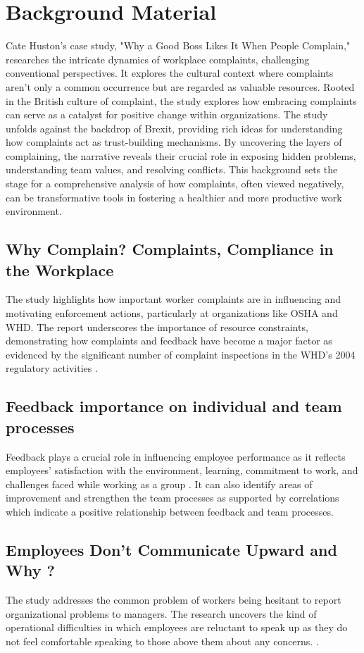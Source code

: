 \documentclass[a4paper,12pt]{report}
\begin{document}
\section{Background Material}
Cate Huston's case study, "Why a Good Boss Likes It When People Complain," researches the intricate dynamics of workplace complaints, challenging conventional perspectives. It explores the cultural context where complaints aren't only a common occurrence but are regarded as valuable resources.  Rooted in the British culture of complaint, the study explores how embracing complaints can serve as a catalyst for positive change within organizations. The study unfolds against the backdrop of Brexit, providing rich ideas for understanding how complaints act as trust-building mechanisms. By uncovering the layers of complaining,  the narrative reveals their crucial role in exposing hidden problems, understanding team values, and resolving conflicts. This background sets the stage for a comprehensive analysis of how complaints, often viewed negatively, can be transformative tools in fostering a healthier and more productive work environment.

\subsection{ Why Complain? Complaints, Compliance in the Workplace}
The study highlights how important worker complaints are in influencing and motivating enforcement actions, particularly at organizations like OSHA and WHD. The report underscores the importance of resource constraints, demonstrating how complaints and feedback have become a major factor as evidenced by the significant number of complaint inspections in the WHD's 2004 regulatory activities \cite{why_complaints}. 
\subsection{Feedback importance on individual and team processes}
Feedback plays a crucial role in influencing employee performance as it reflects employees' satisfaction with the environment, learning, commitment to work, and challenges faced while working as a group \cite{feedback_importance}. It can also identify areas of improvement and strengthen the team processes as supported by correlations which indicate a positive relationship between feedback and team processes. 
\subsection{Employees Don’t Communicate Upward and Why ?}
The study addresses the common problem of workers being hesitant to report organizational problems to managers. The research uncovers the kind of operational difficulties in which employees are reluctant to speak up as they do not feel comfortable speaking to those above them about any concerns. \cite{employee_silence}. 
\newpage
\end{document}

